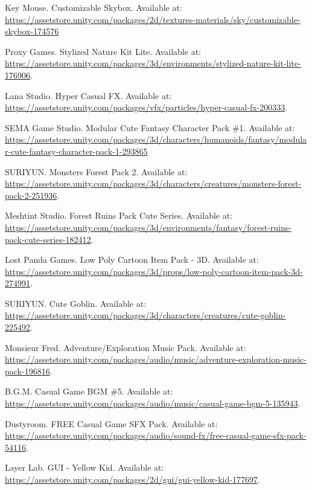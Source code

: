 \documentclass[10pt]{final_report}
\begin{document}
\newpage
{}
{}
\renewcommand{\bibname}{Assets Used}
\begin{thebibliography}{99}

 Key Mouse. Customizable Skybox. Available at: \url{https://assetstore.unity.com/packages/2d/textures-materials/sky/customizable-skybox-174576}

 Proxy Games. Stylized Nature Kit Lite. Available at: \url{https://assetstore.unity.com/packages/3d/environments/stylized-nature-kit-lite-176906}. 

 Lana Studio. Hyper Casual FX. Available at: \url{https://assetstore.unity.com/packages/vfx/particles/hyper-casual-fx-200333}.

 SEMA Game Studio. Modular Cute Fantasy Character Pack \#1. Available at: \url{https://assetstore.unity.com/packages/3d/characters/humanoids/fantasy/modular-cute-fantasy-character-pack-1-293865}

 SURIYUN. Monsters Forest Pack 2. Available at: \url{https://assetstore.unity.com/packages/3d/characters/creatures/monsters-forest-pack-2-251936}. 

 Meshtint Studio. Forest Ruins Pack Cute Series. Available at: \url{https://assetstore.unity.com/packages/3d/environments/fantasy/forest-ruins-pack-cute-series-182412}. 

 Lost Panda Games. Low Poly Cartoon Item Pack - 3D. Available at: \url{https://assetstore.unity.com/packages/3d/props/low-poly-cartoon-item-pack-3d-274991}. 

 SURIYUN. Cute Goblin. Available at: \url{https://assetstore.unity.com/packages/3d/characters/creatures/cute-goblin-225492}. 

 Monsieur Fred. Adventure/Exploration Music Pack. Available at: \url{https://assetstore.unity.com/packages/audio/music/adventure-exploration-music-pack-196816}. 

 B.G.M. Casual Game BGM \#5. Available at: \url{https://assetstore.unity.com/packages/audio/music/casual-game-bgm-5-135943}. 

 Dustyroom. FREE Casual Game SFX  Pack. Available at: \url{https://assetstore.unity.com/packages/audio/sound-fx/free-casual-game-sfx-pack-54116}. 


 Layer Lab. GUI - Yellow Kid. Available at: \url{https://assetstore.unity.com/packages/2d/gui/gui-yellow-kid-177697}. 

\end{thebibliography}

\label{endpage}
\end{document}
